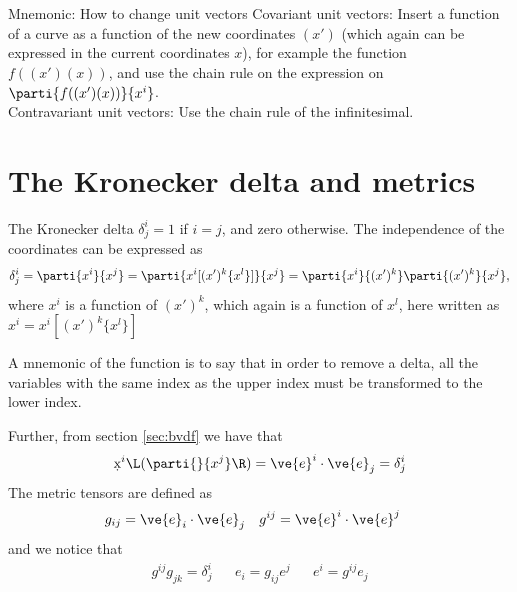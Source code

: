 \documentclass[a4paper, 12pt]{article}
\begin{document}
\vspace{0.5cm}
\begin{greenbox}{Mnemonic: How to change unit vectors}
 Covariant unit vectors: Insert a function of a curve as a function of the new 
 coordinates $(x')$ (which again can be expressed in the current coordinates 
 $x$), for example the function $f((x')(x))$, and use the chain rule on the 
 expression on $\parti{f((x')(x))}{x^i}$.\\
 Contravariant unit vectors: Use the chain rule of the infinitesimal.
\end{greenbox}



\section{The Kronecker delta and metrics}
The Kronecker delta $\delta^i_j = 1$ if $i=j$, and zero otherwise. The 
independence of the coordinates can be expressed as
%
\begin{align*}
 \delta^i_j = \parti{x^i}{x^j} = \parti{x^i[(x')^k\{x^l\}]}{x^j} = 
 \parti{x^i}{(x')^k}\parti{(x')^k}{x^j},
\end{align*}
%
where $x^i$ is a function of $(x')^k$, which again is a function of $x^l$, here 
written as $x^i = x^i[(x')^k\{x^l\}]$

A mnemonic of the function is to say that in order to remove a delta, all the 
variables with the same index as the upper index must be transformed to the 
lower index.

Further, from section \ref{sec:bvdf} we have that
%
\begin{align*}
 \d x^i \L(\parti{}{x^j}\R) = \ve{e}^i\cdot\ve{e}_j = \delta^i_j
\end{align*}
%
The metric tensors are defined as
%
\begin{align*}
 &g_{ij} = \ve{e}_i\cdot\ve{e}_j&
 &g^{ij} = \ve{e}^i\cdot\ve{e}^j
\end{align*}
%
and we notice that
%
\begin{align*}
 &g^{ij} g_{jk} = \delta^i_j&
 &e_i = g_{ij}e^j &
 &e^i = g^{ij}e_j&
\end{align*}
\end{document}
